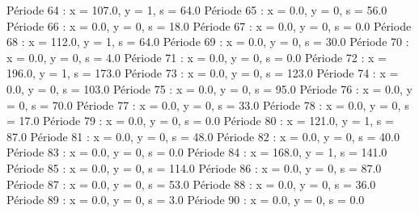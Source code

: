 Période 64 : x = 107.0, y = 1, s = 64.0
Période 65 : x = 0.0, y = 0, s = 56.0
Période 66 : x = 0.0, y = 0, s = 18.0
Période 67 : x = 0.0, y = 0, s = 0.0
Période 68 : x = 112.0, y = 1, s = 64.0
Période 69 : x = 0.0, y = 0, s = 30.0
Période 70 : x = 0.0, y = 0, s = 4.0
Période 71 : x = 0.0, y = 0, s = 0.0
Période 72 : x = 196.0, y = 1, s = 173.0
Période 73 : x = 0.0, y = 0, s = 123.0
Période 74 : x = 0.0, y = 0, s = 103.0
Période 75 : x = 0.0, y = 0, s = 95.0
Période 76 : x = 0.0, y = 0, s = 70.0
Période 77 : x = 0.0, y = 0, s = 33.0
Période 78 : x = 0.0, y = 0, s = 17.0
Période 79 : x = 0.0, y = 0, s = 0.0
Période 80 : x = 121.0, y = 1, s = 87.0
Période 81 : x = 0.0, y = 0, s = 48.0
Période 82 : x = 0.0, y = 0, s = 40.0
Période 83 : x = 0.0, y = 0, s = 0.0
Période 84 : x = 168.0, y = 1, s = 141.0
Période 85 : x = 0.0, y = 0, s = 114.0
Période 86 : x = 0.0, y = 0, s = 87.0
Période 87 : x = 0.0, y = 0, s = 53.0
Période 88 : x = 0.0, y = 0, s = 36.0
Période 89 : x = 0.0, y = 0, s = 3.0
Période 90 : x = 0.0, y = 0, s = 0.0



